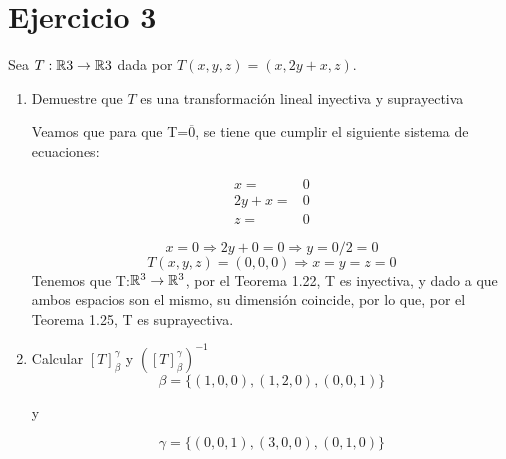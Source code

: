 \section*{Ejercicio 3}

Sea $T: \mathbb{R}{3} \rightarrow \mathbb{R}{3}$ dada por $T(x,y,z) = (x, 2y + x, z)$. 
\begin{enumerate}
    \item Demuestre que $T$ es una transformación lineal inyectiva y suprayectiva

    Veamos que para que T=$\overline{0}$, se tiene que cumplir el siguiente sistema de ecuaciones:

    \begin{align*}
        x = & 0 \\
        2y + x =& 0 \\ 
        z = & 0 
    \end{align*}

    \begin{equation*}
       x=0 \Longrightarrow 2y+0=0 \Longrightarrow y=0/2=0
   \end{equation*}
   \begin{equation*}
       T(x,y,z)=(0,0,0) \Longrightarrow x=y=z=0
   \end{equation*}
   Tenemos que T:$\mathbb{R}^3 \rightarrow \mathbb{R}^3$, por el Teorema 1.22, T es inyectiva, y dado a que ambos espacios son el mismo, su dimensión coincide, por lo que, por el Teorema 1.25, T es suprayectiva.\\


    \item Calcular $\left[ T \right]_{\beta}^{\gamma}$ y $\left( \left[ T \right]_{\beta}^{\gamma} \right)^{-1}$
        \begin{equation*}
            \beta = \{ (1,0,0), (1,2,0), (0,0,1) \}
        \end{equation*}
    
        y 
    
        \begin{equation*}
            \gamma = \{ (0,0,1), (3,0,0), (0,1,0) \}
        \end{equation*}
        
        \vspace{10mm}


\end{enumerate}
